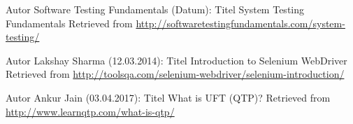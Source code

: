 \begin{thebibliography}{..........}
     Autor	Software Testing Fundamentals (Datum):		%
							Titel	System Testing Fundamentals
							Retrieved from \url{http://softwaretestingfundamentals.com/system-testing/} 


							
	  Autor	Lakshay Sharma (12.03.2014):
							Titel	Introduction to Selenium WebDriver
							Retrieved from \url{http://toolsqa.com/selenium-webdriver/selenium-introduction/} 
	
	  Autor	Ankur Jain (03.04.2017):
							Titel	What is UFT (QTP)?
							Retrieved from \url{http://www.learnqtp.com/what-is-qtp/} 						

\end{thebibliography}




%
%	
%	
%
%
%	
%	
%	
%	
%	
%
%
%							



